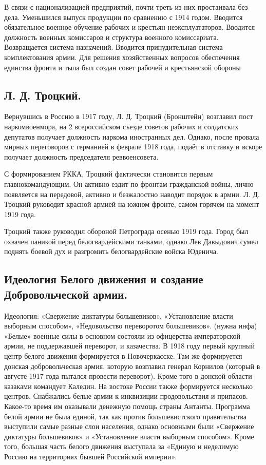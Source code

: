 В связи с национализацией предприятий, почти треть из них простаивала без дела. Уменьшился выпуск продукции по сравнению с 1914 годом.
Вводится обязательное военное обучение рабочих и крестьян неэксплуататоров. Вводится должность военных комиссаров и структура военного комиссариата. Возвращается система назначений. Вводится принудительная система комплектования армии.
Для решения хозяйственных вопросов обеспечения единства фронта и тыла был создан совет рабочей и крестьянской обороны

\subsection{Л. Д. Троцкий.}	

Вернувшись в Россию в 1917 году, Л. Д. Троцкий (Бронштейн) возглавил пост наркомвоенмора, на 2 всероссийском съезде советов рабочих и солдатских депутатов получает должность наркома иностранных дел. Однако, после провала  мирных переговоров с германией в феврале 1918 года, подаёт в отставку и вскоре получает должность председателя реввоенсовета. 

С формированием РККА, Троцкий фактически становится первым главнокомандующим. Он активно ездит по фронтам гражданской войны, лично появляется на передовой, активно и безжалостно наводит порядок в армии. Л. Д. Троцкий руководит красной армией на южном фронте, самом горячем на момент 1919 года.

Троцкий также руководил обороной Петрограда осенью 1919 года. Город был охвачен паникой перед белогвардейскими танками, однако Лев Давыдович сумел поднять боевой дух и разгромить белогвардейские войска Юденича.

\subsection{Идеология Белого движения и создание Добровольческой армии.}

Идеология: «Свержение диктатуры большевиков», «Установление власти выборным способом», «Недовольство переворотом большевиков». (нужна инфа)
«Белые» военные силы в основном состояли из офицерства императорской армии, не поддержавшей переворот, и казачества. В 1918 году первый крупный центр белого движения формируется в Новочеркасске. Там же формируется донская добровольческая армия, которую возглавил генерал Корнилов (который в августе 1917 года пытался провести переворот). Кроме того в донской области казаками командует Каледин. На востоке России также формируется несколько центров.
Снабжались белые армии к инквизиции продовольствия и припасов. Какое-то время им оказывали денежную помощь страны Антанты.
Программа белой армии не была единой, так как против большевистского правительства выступили самые разные слои населения, однако основными были «Свержение диктатуры большевиков» и «Установление власти выборным способом». Кроме того, большая часть белого движения выступала за «Единую и неделимую Россию на территориях бывшей Российской	 империи».

